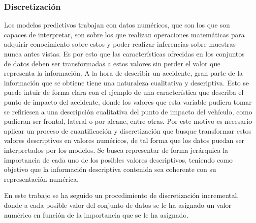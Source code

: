 \documentclass{uathesis-es}
\begin{document}
\subsubsection{Discretización}

Los modelos predictivos trabajan con datos numéricos, que son los que son capaces de interpretar, son sobre los que realizan operaciones matemáticas para adquirir conocimiento sobre estos y poder realizar inferencias sobre muestras nunca antes vistas. Es por esto que las características ofrecidas en los conjuntos de datos deben ser transformadas a estos valores sin perder el valor que representa la información. A la hora de describir un accidente, gran parte de la información que se obtiene tiene una naturaleza cualitativa y descriptiva. Esto se puede intuir de forma clara con el ejemplo de una característica que describa el punto de impacto del accidente, donde los valores que esta variable pudiera tomar se refiriesen a una descripción cualitativa del punto de impacto del vehículo, como pudieran ser frontal, lateral o por alcane, entre otras. Por este motivo es necesario aplicar un proceso de cuantificación y discretización que busque transformar estos valores descriptivos en valores numéricos, de tal forma que los datos puedan ser interpretados por los modelos. Se busca representar de forma jerárquica la importancia de cada uno de los posibles valores descriptivos, teniendo como objetivo que la información descriptiva contenida sea coherente con su representación numérica.


En este trabajo se ha seguido un procedimiento de discretización incremental, donde a cada posible valor del conjunto de datos se le ha asignado un valor numérico en función de la importancia que se le ha asignado.

\end{document}
